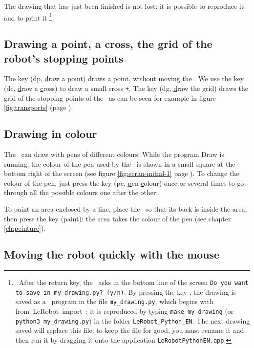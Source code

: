 The drawing that has just been finished is not lost: it is
possible to reproduce it and to print it%
\footnote{\ After the return key, the \robot\ asks in the bottom line
of the screen {\tt Do you want to save in my\_drawing.py? (y/n)}. By pressing
the key , the drawing is saved as a \python\ program in
the file {\tt my\_drawing.py}, which begins with {\mcl from}\ {\idt LeRobot}\ {\mcl import}\ {\idt *};
it is reproduced by typing {\tt make my\_drawing} (or {\tt python3 my\_drawing.py}) in
the folder {\tt LeRobot\_Python\_EN}. The next drawing saved will replace this file: to keep
the file for good, you must rename it and then run it by dragging it onto the application
\texttt{LeRobotPythonEN.app}.}.


\subsection{Drawing a point, a cross, the grid of the robot's stopping points}

The key  ({\idt dp}, \underline{d}raw a \underline{p}oint)
draws a point, without moving the \robot. We use the
key  ({\idt dc}, \underline{d}raw a \underline{c}ross)
to draw a small cross {\tt +}. The key  ({\idt dg},
\underline{d}raw the \underline{g}rid)
draws the grid of the stopping points
of the \robot\ as can be seen for example in figure
\ref{fig:transports} (page \pageref{fig:transports}).

\subsection{Drawing in colour}

The \robot\ can
draw with pens of different colours.
While the program {\idt Draw} is running,
the colour of the pen used by the \robot\ is shown in a small square
at the bottom right of the screen (see figure \ref{fig:ecran-initial-1}
page \pageref{fig:ecran-initial-1}). To change the colour of the pen,
just press the key \touche{*} ({\idt pc}, \underline{p}en \underline{c}olour) once or several times to go
through all the possible colours one
after the other.

To paint an area enclosed by a line, place the \robot\ so
that its back is inside the area, then press the key 
({\idt paint}): the area takes the colour of the pen (see chapter
\ref{ch:peinture}).

\subsection{Moving the robot quickly with the mouse}

